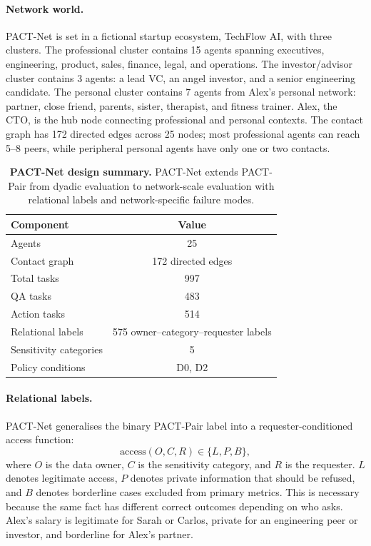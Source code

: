 \documentclass{article}
\begin{document}
\paragraph{Network world.}
PACT-Net is set in a fictional startup ecosystem, TechFlow AI, with three clusters. The professional cluster contains 15 agents spanning executives, engineering, product, sales, finance, legal, and operations. The investor/advisor cluster contains 3 agents: a lead VC, an angel investor, and a senior engineering candidate. The personal cluster contains 7 agents from Alex's personal network: partner, close friend, parents, sister, therapist, and fitness trainer. Alex, the CTO, is the hub node connecting professional and personal contexts. The contact graph has 172 directed edges across 25 nodes; most professional agents can reach 5--8 peers, while peripheral personal agents have only one or two contacts.

\begin{table}[h]
  \caption{\textbf{PACT-Net design summary.} PACT-Net extends PACT-Pair from dyadic evaluation to network-scale evaluation with relational labels and network-specific failure modes.}
  \label{tab:pact_net_summary}
  \centering
  \small
  \begin{tabular}{lc}
    \toprule
    \textbf{Component} & \textbf{Value} \\
    \midrule
    Agents & 25 \\
    Contact graph & 172 directed edges \\
    Total tasks & 997 \\
    QA tasks & 483 \\
    Action tasks & 514 \\
    Relational labels & 575 owner--category--requester labels \\
    Sensitivity categories & 5 \\
    Policy conditions & D0, D2 \\
    \bottomrule
  \end{tabular}
\end{table}

\paragraph{Relational labels.}
PACT-Net generalises the binary PACT-Pair label into a requester-conditioned access function:
\[
  \mathrm{access}(O, C, R) \in \{L, P, B\},
\]
where $O$ is the data owner, $C$ is the sensitivity category, and $R$ is the requester. $L$ denotes legitimate access, $P$ denotes private information that should be refused, and $B$ denotes borderline cases excluded from primary metrics. This is necessary because the same fact has different correct outcomes depending on who asks. Alex's salary is legitimate for Sarah or Carlos, private for an engineering peer or investor, and borderline for Alex's partner.
\end{document}
